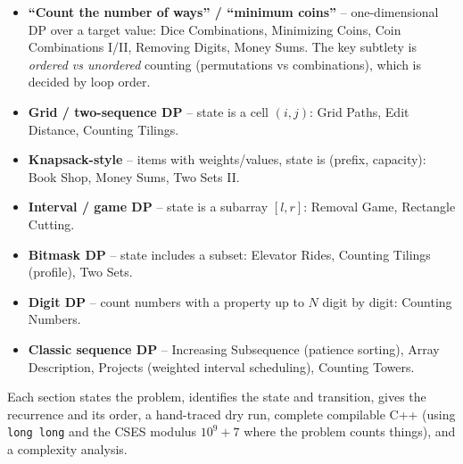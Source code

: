 \begin{patternbox}
\begin{itemize}
  \item \textbf{``Count the number of ways'' / ``minimum coins''} --
        one-dimensional DP over a target value: Dice Combinations,
        Minimizing Coins, Coin Combinations I/II, Removing Digits,
        Money Sums. The key subtlety is \emph{ordered vs unordered}
        counting (permutations vs combinations), which is decided by
        loop order.
  \item \textbf{Grid / two-sequence DP} -- state is a cell $(i,j)$:
        Grid Paths, Edit Distance, Counting Tilings.
  \item \textbf{Knapsack-style} -- items with weights/values, state is
        (prefix, capacity): Book Shop, Money Sums, Two Sets II.
  \item \textbf{Interval / game DP} -- state is a subarray $[l,r]$:
        Removal Game, Rectangle Cutting.
  \item \textbf{Bitmask DP} -- state includes a subset: Elevator Rides,
        Counting Tilings (profile), Two Sets.
  \item \textbf{Digit DP} -- count numbers with a property up to $N$
        digit by digit: Counting Numbers.
  \item \textbf{Classic sequence DP} -- Increasing Subsequence (patience
        sorting), Array Description, Projects (weighted interval
        scheduling), Counting Towers.
\end{itemize}
\end{patternbox}

Each section states the problem, identifies the state and transition,
gives the recurrence and its order, a hand-traced dry run, complete
compilable C++ (using \texttt{long long} and the CSES modulus
$10^9+7$ where the problem counts things), and a complexity analysis.

\newpage




















